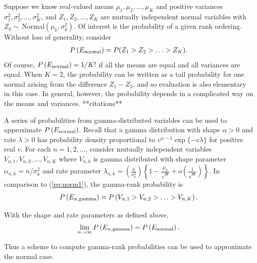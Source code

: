 Suppose we know real-valued means $\mu_1, \mu_2, \ldots, \mu_K$  and
positive variances $\sigma_1^2, \sigma_2^2, \ldots, \sigma_K^2$, 
and $Z_1, Z_2, \ldots, Z_K$ are mutually independent normal variables with
$Z_k \sim \, $Normal$(\mu_k, \sigma_k^2)$.  Of interest is the probability
of a given rank ordering.  Without loss of generality, consider
\begin{eqnarray}
\label{eq:norm1}
P\left( E_{\rm normal} \right) = P( Z_1 > Z_2 > \ldots > Z_K ).
\end{eqnarray}
Of course, $P\left( E_{\rm normal} \right) = 1/K! $ if all the means
are equal and all variances are equal.  
When $K=2$, the probability can be written as a tail probability for
one normal arising from the difference $Z_1-Z_2$, and so evaluation is also
elementary in this case.  In general, however, the probability 
depends in a complicated way on the means and variances. **citations**


A series of probabilities from gamma-distributed variables can be used
to approximate $P\left( E_{\rm normal} \right)$.  
 Recall that a gamma distribution 
with shape $\alpha >0$ and rate $\lambda >0$
has probability density proportional to 
$ v^{\alpha -1} \exp\{ -v \lambda \} $ for positive real $v$.
For each $n=1,2, \ldots$,
consider mutually independent variables $V_{n,1}, V_{n,2}, \ldots, V_{n,K}$
where $V_{n,k}$ is gamma distributed with shape parameter 
$\alpha_{n,k} = n/\sigma_k^2$ and rate parameter
$\lambda_{n,k} = \left( \frac{ n }{ \sigma_k^2}\right) \left\{  1 - \frac{\mu_k}{\sqrt{n}} + 
 	o\left( \frac{1}{\sqrt{n}} \right) \right\}.$
In comparison to (\ref{eq:norm1}), the gamma-rank probability is
\begin{eqnarray}
\label{eq:gam1}
P\left( E_{n, {\rm gamma}} \right) =
 P\left( V_{n,1} > V_{n,2} > \ldots  > V_{n,K} \right).
\end{eqnarray}

\begin{theorem}
With the shape and rate parameters as defined above,
\begin{eqnarray*}
\lim_{n\rightarrow \infty} P\left( E_{n, {\rm gamma}} \right) 
 = P\left( E_{\rm normal} \right).
\end{eqnarray*}
\end{theorem}
Thus a scheme to compute gamma-rank probabilities can be used 
to approximate the normal case.


